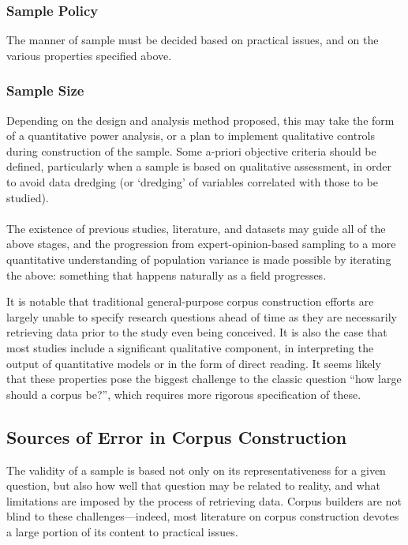 \subsubsection{Sample Policy}
The manner of sample must be decided based on practical issues, and on the various properties specified above.

\subsubsection{Sample Size}
Depending on the design and analysis method proposed, this may take the form of a quantitative power analysis, or a plan to implement qualitative controls during construction of the sample.  Some a-priori objective criteria should be defined, particularly when a sample is based on qualitative assessment, in order to avoid data dredging (or `dredging' of variables correlated with those to be studied).

\paragraph{}
The existence of previous studies, literature, and datasets may guide all of the above stages, and the progression from expert-opinion-based sampling to a more quantitative understanding of population variance is made possible by iterating the above: something that happens naturally as a field progresses.

It is notable that traditional general-purpose corpus construction efforts are largely unable to specify research questions ahead of time as they are necessarily retrieving data prior to the study even being conceived.  It is also the case that most studies include a significant qualitative component, in interpreting the output of quantitative models or in the form of direct reading\cite{rayson2008keysem}.
It seems likely that these properties pose the biggest challenge to the classic question ``how large should a corpus be?'', which requires more rigorous specification of these.






\subsection{Sources of Error in Corpus Construction}
The validity of a sample is based not only on its representativeness for a given question, but also how well that question may be related to reality, and what limitations are imposed by the process of retrieving data.
Corpus builders are not blind to these challenges---indeed, most literature on corpus construction devotes a large portion of its content to practical issues\cite{wynne2005developing,atkins1992corpus,EagTcwgCtypeaglespreliminary}.

